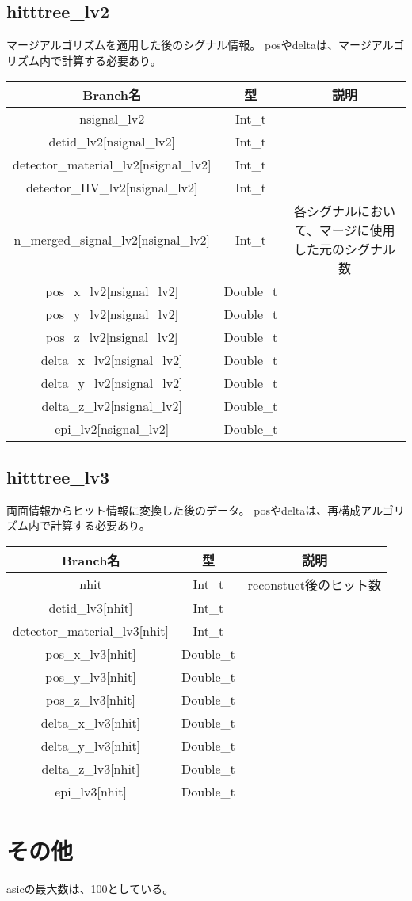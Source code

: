 \documentclass[10.5pt]{jsarticle}
\begin{document}
\subsection{hitttree\_lv2}
マージアルゴリズムを適用した後のシグナル情報。
posやdeltaは、マージアルゴリズム内で計算する必要あり。
\begin{table}[htb]
  \begin{tabular}{|c|c|c|} \hline
  Branch名 & 型 & 説明 \\ \hline
nsignal\_lv2 & Int\_t & \\
detid\_lv2[nsignal\_lv2] & Int\_t & \\
detector\_material\_lv2[nsignal\_lv2] & Int\_t & \\
detector\_HV\_lv2[nsignal\_lv2] & Int\_t & \\
n\_merged\_signal\_lv2[nsignal\_lv2] & Int\_t & 各シグナルにおいて、マージに使用した元のシグナル数\\
pos\_x\_lv2[nsignal\_lv2] & Double\_t & \\
pos\_y\_lv2[nsignal\_lv2] & Double\_t & \\
pos\_z\_lv2[nsignal\_lv2] & Double\_t & \\
delta\_x\_lv2[nsignal\_lv2] & Double\_t & \\
delta\_y\_lv2[nsignal\_lv2] & Double\_t & \\
delta\_z\_lv2[nsignal\_lv2] & Double\_t & \\
epi\_lv2[nsignal\_lv2] & Double\_t & \\
 \hline
  \end{tabular}
\end{table}

\subsection{hitttree\_lv3}
両面情報からヒット情報に変換した後のデータ。
posやdeltaは、再構成アルゴリズム内で計算する必要あり。

\begin{table}[htb]
\begin{tabular}{|c|c|c|} \hline
Branch名 & 型 & 説明 \\ \hline
nhit & Int\_t & reconstuct後のヒット数\\
detid\_lv3[nhit] & Int\_t & \\
detector\_material\_lv3[nhit] & Int\_t & \\
pos\_x\_lv3[nhit] & Double\_t & \\
pos\_y\_lv3[nhit] & Double\_t & \\
pos\_z\_lv3[nhit] & Double\_t & \\
delta\_x\_lv3[nhit] & Double\_t & \\
delta\_y\_lv3[nhit] & Double\_t & \\
delta\_z\_lv3[nhit] & Double\_t & \\
epi\_lv3[nhit] & Double\_t & \\ \hline
  \end{tabular}
\end{table}

\section{その他}
asicの最大数は、100としている。
\end{document}
